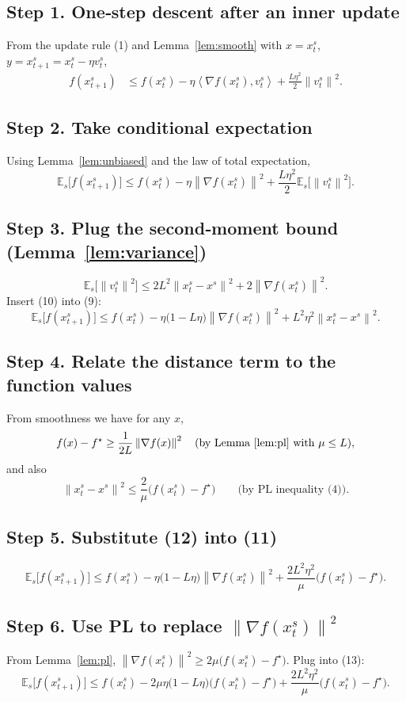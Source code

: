 \documentclass{article}
\newcommand{\EE}{\mathbb{E}}
\newcommand{\grad}{\nabla}
\newcommand{\norm}[1]{\left\|#1\right\|}
\newcommand{\inner}[2]{\left\langle #1,#2\right\rangle}
\begin{document}
\subsection*{Step 1. One‑step descent after an inner update}
From the update rule (1) and Lemma~\ref{lem:smooth} with $x=x_{t}^{s}$,
$y=x_{t+1}^{s}=x_{t}^{s}-\eta v_{t}^{s}$,
\[
\begin{aligned}
f(x_{t+1}^{s})
&\le f(x_{t}^{s})-\eta\inner{\grad f(x_{t}^{s})}{v_{t}^{s}}
      +\frac{L\eta^{2}}{2}\norm{v_{t}^{s}}^{2}.
\tag{8}
\end{aligned}
\]
\subsection*{Step 2. Take conditional expectation}
Using Lemma~\ref{lem:unbiased} and the law of total expectation,
\[
\EE_{s}\!\bigl[f(x_{t+1}^{s})\bigr]
\le f(x_{t}^{s})-\eta\norm{\grad f(x_{t}^{s})}^{2}
   +\frac{L\eta^{2}}{2}\EE_{s}\!\bigl[\norm{v_{t}^{s}}^{2}\bigr].
\tag{9}
\]
\subsection*{Step 3. Plug the second‑moment bound (Lemma~\ref{lem:variance})}
\[
\EE_{s}\!\bigl[\norm{v_{t}^{s}}^{2}\bigr]
\le 2L^{2}\norm{x_{t}^{s}-x^{s}}^{2}+2\norm{\grad f(x_{t}^{s})}^{2}.
\tag{10}
\]
Insert (10) into (9):
\[
\EE_{s}\!\bigl[f(x_{t+1}^{s})\bigr]
\le f(x_{t}^{s})
      -\eta\bigl(1-L\eta\bigr)\norm{\grad f(x_{t}^{s})}^{2}
      +L^{2}\eta^{2}\norm{x_{t}^{s}-x^{s}}^{2}.
\tag{11}
\]
\subsection*{Step 4. Relate the distance term to the function values}
From smoothness we have for any $x$,
\[
f(x)-f^{\star}\ge \frac{1}{2L}\norm{\grad f(x)}^{2} \quad\text{(by Lemma~\ref{lem:pl} with } \mu\le L\text{)},
\]
and also
\[
\norm{x_{t}^{s}-x^{s}}^{2}
\le \frac{2}{\mu}\bigl(f(x_{t}^{s})-f^{\star}\bigr)   \qquad\text{(by PL inequality (4))}.
\tag{12}
\]
\subsection*{Step 5. Substitute (12) into (11)}
\[
\EE_{s}\!\bigl[f(x_{t+1}^{s})\bigr]
\le f(x_{t}^{s})
      -\eta\bigl(1-L\eta\bigr)\norm{\grad f(x_{t}^{s})}^{2}
      +\frac{2L^{2}\eta^{2}}{\mu}\bigl(f(x_{t}^{s})-f^{\star}\bigr).
\tag{13}
\]
\subsection*{Step 6. Use PL to replace $\norm{\grad f(x_{t}^{s})}^{2}$}
From Lemma~\ref{lem:pl}, $\norm{\grad f(x_{t}^{s})}^{2}\ge 2\mu\bigl(f(x_{t}^{s})-f^{\star}\bigr)$. Plug into (13):
\[
\EE_{s}\!\bigl[f(x_{t+1}^{s})\bigr]
\le f(x_{t}^{s})
      -2\mu\eta\bigl(1-L\eta\bigr)\bigl(f(x_{t}^{s})-f^{\star}\bigr)
      +\frac{2L^{2}\eta^{2}}{\mu}\bigl(f(x_{t}^{s})-f^{\star}\bigr).
\tag{14}
\]
\end{document}
